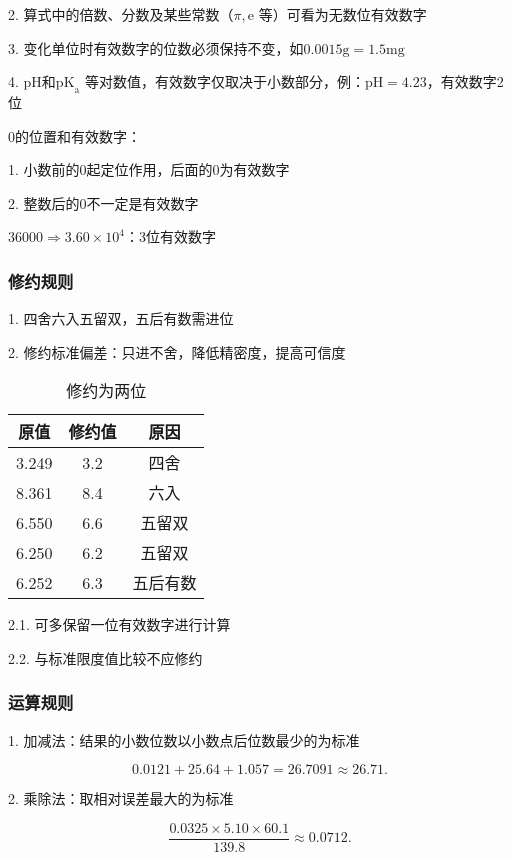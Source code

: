 2. 算式中的倍数、分数及某些常数（$\pi,\mathrm{e}$ 等）可看为无数位有效数字

3. 变化单位时有效数字的位数必须保持不变，如$0.0015\text{g}=1.5\text{mg}$ 

4. pH和$\text{pK}_{\text{a}}$ 等对数值，有效数字仅取决于小数部分，例：$\text{pH}=4.23$，有效数字2位

\begin{notation}
    0的位置和有效数字：

    1. 小数前的0起定位作用，后面的0为有效数字

    2. 整数后的0不一定是有效数字

    \begin{eg}
        $36000 \Rightarrow 3.60\times 10^4$：3位有效数字
    \end{eg}    
\end{notation}
\subsubsection{修约规则}%
\label{subsub:修约规则}
1. 四舍六入五留双，五后有数需进位

2. 修约标准偏差：只进不舍，降低精密度，提高可信度

\begin{table}[htpb]
    \centering
    \caption{修约为两位}
    \label{tab:修约为两位}
    \begin{tabular}{ccc}
    \toprule
    原值 & 修约值 & 原因\\
    \midrule
    3.249 & 3.2 & 四舍\\
    8.361 & 8.4 & 六入\\
    6.550 & 6.6 & 五留双\\
    6.250 & 6.2 & 五留双\\
    6.252 & 6.3 & 五后有数\\
    \bottomrule
    \end{tabular}
\end{table}

2.1. 可多保留一位有效数字进行计算

2.2. 与标准限度值比较不应修约
\subsubsection{运算规则}%
\label{subsub:运算规则}
1. 加减法：结果的小数位数以小数点后位数最少的为标准
\begin{eg}
\[
    0.0121+25.64+1.057=26.7091\approx 26.71
.\]
\end{eg}

2. 乘除法：取相对误差最大的为标准
\begin{eg}
    \[
        \frac{0.0325\times 5.10\times 60.1}{139.8}\approx 0.0712
    .\]     
\end{eg}

